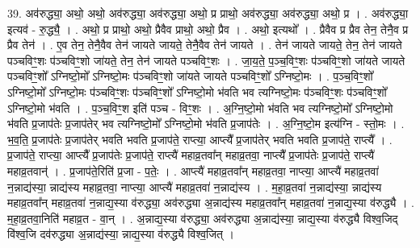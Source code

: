 \documentclass[17pt]{extarticle}
\begin{document}
39. अव॑रुद्ध्या॒ अथो॒ अथो॒ अव॑रुद्ध्या॒ अव॑रुद्ध्या॒ अथो॒ प्र प्राथो॒ अव॑रुद्ध्या॒ अव॑रुद्ध्या॒ अथो॒ प्र । . अव॑रुद्ध्या॒ इत्यव॑ - रु॒द्ध्यै॒ । . अथो॒ प्र प्राथो॒ अथो॒ प्रैवैव प्राथो॒ अथो॒ प्रैव । . अथो॒ इत्यथो᳚ । . प्रैवैव प्र प्रैव तेन॒ तेनै॒व प्र प्रैव तेन॑ । . ए॒व तेन॒ तेनै॒वैव तेन॑ जायते जायते॒ तेनै॒वैव तेन॑ जायते । . तेन॑ जायते जायते॒ तेन॒ तेन॑ जायते पञ्चविꣳ॒॒शः प॑ञ्चविꣳ॒॒शो जा॑यते॒ तेन॒ तेन॑ जायते पञ्चविꣳ॒॒शः । . जा॒य॒ते॒ प॒ञ्च॒विꣳ॒॒शः प॑ञ्चविꣳ॒॒शो जा॑यते जायते पञ्चविꣳ॒॒शो᳚ ऽग्निष्टो॒मो᳚ ऽग्निष्टो॒मः प॑ञ्चविꣳ॒॒शो जा॑यते जायते पञ्चविꣳ॒॒शो᳚ ऽग्निष्टो॒मः । . प॒ञ्च॒विꣳ॒॒शो᳚ ऽग्निष्टो॒मो᳚ ऽग्निष्टो॒मः प॑ञ्चविꣳ॒॒शः प॑ञ्चविꣳ॒॒शो᳚ ऽग्निष्टो॒मो भ॑वति भव त्यग्निष्टो॒मः प॑ञ्चविꣳ॒॒शः प॑ञ्चविꣳ॒॒शो᳚ ऽग्निष्टो॒मो भ॑वति । . प॒ञ्च॒विꣳ॒॒श इति॑ पञ्च - विꣳ॒॒शः । . अ॒ग्नि॒ष्टो॒मो भ॑वति भव त्यग्निष्टो॒मो᳚ ऽग्निष्टो॒मो भ॑वति प्र॒जाप॑तेः प्र॒जाप॑तेर् भव त्यग्निष्टो॒मो᳚ ऽग्निष्टो॒मो भ॑वति प्र॒जाप॑तेः । . अ॒ग्नि॒ष्टो॒म इत्य॑ग्नि - स्तो॒मः । . भ॒व॒ति॒ प्र॒जाप॑तेः प्र॒जाप॑तेर् भवति भवति प्र॒जाप॑ते॒ राप्त्या॒ आप्त्यै᳚ प्र॒जाप॑तेर् भवति भवति प्र॒जाप॑ते॒ राप्त्यै᳚ । . प्र॒जाप॑ते॒ राप्त्या॒ आप्त्यै᳚ प्र॒जाप॑तेः प्र॒जाप॑ते॒ राप्त्यै॑ महाव्र॒तवा᳚न् महाव्र॒तवा॒ नाप्त्यै᳚ प्र॒जाप॑तेः प्र॒जाप॑ते॒ राप्त्यै॑ महाव्र॒तवान्॑ । . प्र॒जाप॑ते॒रिति॑ प्र॒जा - प॒तेः॒ । . आप्त्यै॑ महाव्र॒तवा᳚न् महाव्र॒तवा॒ नाप्त्या॒ आप्त्यै॑ महाव्र॒तवा॑ न॒न्नाद्य॑स्या॒ न्नाद्य॑स्य महाव्र॒तवा॒ नाप्त्या॒ आप्त्यै॑ महाव्र॒तवा॑ न॒न्नाद्य॑स्य । . म॒हा॒व्र॒तवा॑ न॒न्नाद्य॑स्या॒ न्नाद्य॑स्य महाव्र॒तवा᳚न् महाव्र॒तवा॑ न॒न्नाद्य॒स्या व॑रुद्ध्या॒ अव॑रुद्ध्या अ॒न्नाद्य॑स्य महाव्र॒तवा᳚न् महाव्र॒तवा॑ न॒न्नाद्य॒स्या व॑रुद्ध्यै । . म॒हा॒व्र॒तवा॒निति॑ महाव्र॒त - वा॒न् । . अ॒न्नाद्य॒स्या व॑रुद्ध्या॒ अव॑रुद्ध्या अ॒न्नाद्य॑स्या॒ न्नाद्य॒स्या व॑रुद्ध्यै विश्व॒जिद् वि॑श्व॒जि दव॑रुद्ध्या अ॒न्नाद्य॑स्या॒ न्नाद्य॒स्या व॑रुद्ध्यै विश्व॒जित् । \newline
\end{document}

